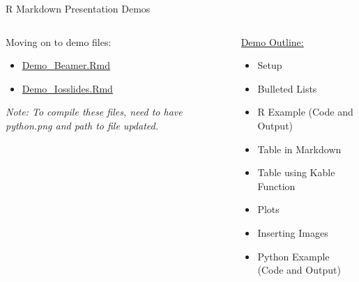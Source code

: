 \documentclass{beamer}
\begin{document}




\begin{frame}{R Markdown Presentation Demos}
    
\begin{columns}
\begin{column}{0.38\textwidth}
Moving on to demo files:
\begin{itemize}
\item \url{Demo_Beamer.Rmd}
\item \url{Demo_Iosslides.Rmd}
\end{itemize}
\vspace{0.5in}

\emph{Note: To compile these files, need to have python.png and path to file updated.}
\end{column}

\begin{column}{0.6\textwidth}
\underline{Demo Outline:}
\begin{itemize}
    \item Setup
    \item Bulleted Lists
    \item R Example (Code and Output)
    \item Table in Markdown
    \item Table using Kable Function
    \item Plots
    \item Inserting Images
    \item Python Example (Code and Output)
\end{itemize}
\end{column}
\end{columns}
\end{frame}
\end{document}
